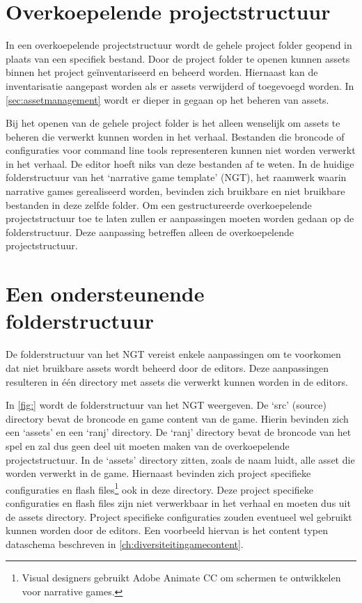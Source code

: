 \section{Overkoepelende projectstructuur}
In een overkoepelende projectstructuur wordt de gehele project folder geopend in plaats van een specifiek bestand. Door de project folder te openen kunnen assets binnen het project geïnventariseerd en beheerd worden. Hiernaast kan de inventarisatie aangepast worden als er assets verwijderd of toegevoegd worden. In \autoref{sec:assetmanagement} wordt er dieper in gegaan op het beheren van assets.

Bij het openen van de gehele project folder is het alleen wenselijk om assets te beheren die verwerkt kunnen worden in het verhaal. Bestanden die broncode of configuraties voor command line tools representeren kunnen niet worden verwerkt in het verhaal. De editor hoeft niks van deze bestanden af te weten. In de huidige folderstructuur van het ‘narrative game template’ (NGT), het raamwerk waarin narrative games gerealiseerd worden, bevinden zich bruikbare en niet bruikbare bestanden in deze zelfde folder. Om een gestructureerde overkoepelende projectstructuur toe te laten zullen er aanpassingen moeten worden gedaan op de folderstructuur. Deze aanpassing betreffen alleen de overkoepelende projectstructuur.

\section{Een ondersteunende folderstructuur}
De folderstructuur van het NGT vereist enkele aanpassingen om te voorkomen dat niet bruikbare assets wordt beheerd door de editors. Deze aanpassingen resulteren in één directory met assets die verwerkt kunnen worden in de editors.

In \autoref{fig:} wordt de folderstructuur van het NGT weergeven. De ‘src’ (source) directory bevat de broncode en game content van de game. Hierin bevinden zich een ‘assets’ en een ‘ranj’ directory. De ‘ranj’ directory bevat de broncode van het spel en zal dus geen deel uit moeten maken van de overkoepelende projectstructuur. In de ‘assets’ directory zitten, zoals de naam luidt, alle asset die worden verwerkt in de game. Hiernaast bevinden zich project specifieke configuraties en flash files\footnote{Visual designers gebruikt Adobe Animate CC om schermen te ontwikkelen voor narrative games.} ook in deze directory. Deze project specifieke configuraties en flash files zijn niet verwerkbaar in het verhaal en moeten dus uit de assets directory. Project specifieke configuraties zouden eventueel wel gebruikt kunnen worden door de editors. Een voorbeeld hiervan is het content typen dataschema beschreven in \autoref{ch:diversiteitingamecontent}. 

